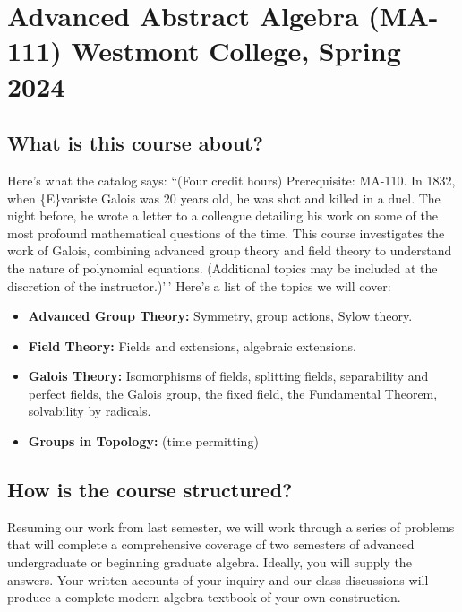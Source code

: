 \documentclass[
  twoside]{article}
\author{}
\date{\vspace{-2.5em}}
\begin{document}
\hypertarget{advanced-abstract-algebra-ma-111-westmont-college-spring-2024}{%
\section{Advanced Abstract Algebra (MA-111) Westmont College, Spring
2024}\label{advanced-abstract-algebra-ma-111-westmont-college-spring-2024}}

\hypertarget{what-is-this-course-about}{%
\subsection{What is this course
about?}\label{what-is-this-course-about}}

Here's what the catalog says: ``(Four credit hours) Prerequisite:
MA-110. In 1832, when \textquotesingle\{E\}variste Galois was 20 years
old, he was shot and killed in a duel. The night before, he wrote a
letter to a colleague detailing his work on some of the most profound
mathematical questions of the time. This course investigates the work of
Galois, combining advanced group theory and field theory to understand
the nature of polynomial equations. (Additional topics may be included
at the discretion of the instructor.)'\,' Here's a list of the topics we
will cover:

\begin{itemize}[itemsep=0pt, parsep=1pt, partopsep=-5pt]
      \item \textbf{Advanced Group Theory:}  Symmetry, group actions, Sylow theory.
      \item \textbf{Field Theory:} Fields and extensions, algebraic extensions.
      \item \textbf{Galois Theory:} Isomorphisms of fields, splitting fields, separability and perfect fields, the Galois group, the fixed field, the Fundamental Theorem, solvability by radicals.
     \item \textbf{Groups in Topology:} (time permitting)
  \end{itemize}

\hypertarget{how-is-the-course-structured}{%
\subsection{How is the course
structured?}\label{how-is-the-course-structured}}

Resuming our work from last semester, we will work through a series of
problems that will complete a comprehensive coverage of two semesters of
advanced undergraduate or beginning graduate algebra. Ideally, you will
supply the answers. Your written accounts of your inquiry and our class
discussions will produce a complete modern algebra textbook of your own
construction.
\end{document}
